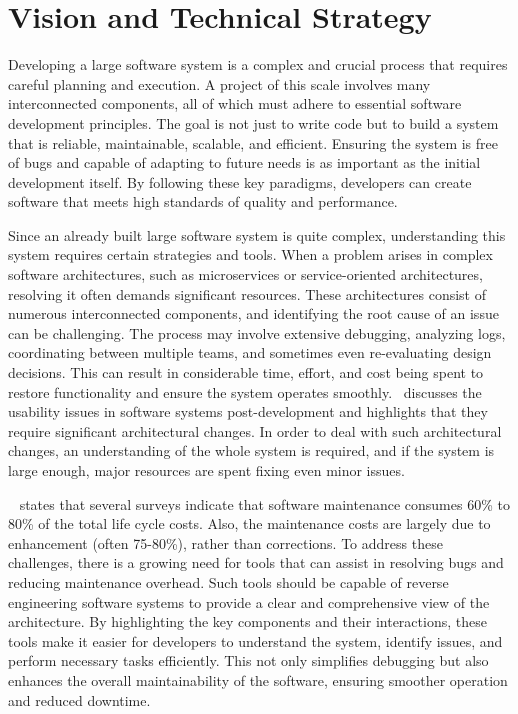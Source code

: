 \chapter{Vision and Technical Strategy}

Developing a large software system is a complex and crucial process that requires careful planning and execution. A project of this scale involves many interconnected components, all of which must adhere to essential software development principles. The goal is not just to write code but to build a system that is reliable, maintainable, scalable, and efficient. Ensuring the system is free of bugs and capable of adapting to future needs is as important as the initial development itself. By following these key paradigms, developers can create software that meets high standards of quality and performance.

Since an already built large software system is quite complex, understanding this system requires certain strategies and tools. When a problem arises in complex software architectures, such as microservices or service-oriented architectures, resolving it often demands significant resources. These architectures consist of numerous interconnected components, and identifying the root cause of an issue can be challenging. The process may involve extensive debugging, analyzing logs, coordinating between multiple teams, and sometimes even re-evaluating design decisions. This can result in considerable time, effort, and cost being spent to restore functionality and ensure the system operates smoothly.~\citep{Folmer2005} discusses the usability issues in software systems post-development and highlights that they require significant architectural changes. In order to deal with such architectural changes, an understanding of the whole system is required, and if the system is large enough, major resources are spent fixing even minor issues.

~\citep{SeMaintainance2001} states that several surveys indicate that software maintenance consumes 60\% to 80\% of the total life cycle costs. Also, the maintenance costs are largely due to enhancement (often 75{-}80\%), rather than corrections. To address these challenges, there is a growing need for tools that can assist in resolving bugs and reducing maintenance overhead. Such tools should be capable of reverse engineering software systems to provide a clear and comprehensive view of the architecture. By highlighting the key components and their interactions, these tools make it easier for developers to understand the system, identify issues, and perform necessary tasks efficiently. This not only simplifies debugging but also enhances the overall maintainability of the software, ensuring smoother operation and reduced downtime.

